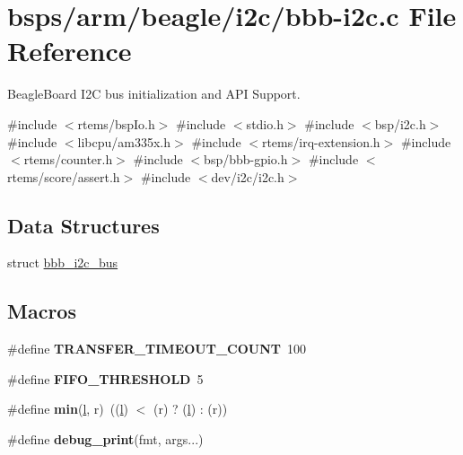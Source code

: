 \hypertarget{bbb-i2c_8c}{}\section{bsps/arm/beagle/i2c/bbb-\/i2c.c File Reference}
\label{bbb-i2c_8c}


Beagle\+Board I2C bus initialization and A\+PI Support.  


{\ttfamily \#include $<$rtems/bsp\+Io.\+h$>$}\newline
{\ttfamily \#include $<$stdio.\+h$>$}\newline
{\ttfamily \#include $<$bsp/i2c.\+h$>$}\newline
{\ttfamily \#include $<$libcpu/am335x.\+h$>$}\newline
{\ttfamily \#include $<$rtems/irq-\/extension.\+h$>$}\newline
{\ttfamily \#include $<$rtems/counter.\+h$>$}\newline
{\ttfamily \#include $<$bsp/bbb-\/gpio.\+h$>$}\newline
{\ttfamily \#include $<$rtems/score/assert.\+h$>$}\newline
{\ttfamily \#include $<$dev/i2c/i2c.\+h$>$}\newline
\subsection*{Data Structures}
\begin{DoxyCompactItemize}
\item 
struct \mbox{\hyperlink{structbbb__i2c__bus}{bbb\+\_\+i2c\+\_\+bus}}
\end{DoxyCompactItemize}
\subsection*{Macros}
\begin{DoxyCompactItemize}
\item 
\mbox{\label{bbb-i2c_8c_aaa02cd8bfe5cbd03a2bd1d65aa999534}} 
\#define {\bfseries T\+R\+A\+N\+S\+F\+E\+R\+\_\+\+T\+I\+M\+E\+O\+U\+T\+\_\+\+C\+O\+U\+NT}~100
\item 
\mbox{\label{bbb-i2c_8c_a7d44477546ebc96920125d612e718b10}} 
\#define {\bfseries F\+I\+F\+O\+\_\+\+T\+H\+R\+E\+S\+H\+O\+LD}~5
\item 
\mbox{\label{bbb-i2c_8c_a8a23efc88a0a2646598e949f40d96d0d}} 
\#define {\bfseries min}(\mbox{\hyperlink{sun4u_2tte_8h_ab80d2bb0a8a32941fb282b41785ce07f}{l}},  r)~((\mbox{\hyperlink{sun4u_2tte_8h_ab80d2bb0a8a32941fb282b41785ce07f}{l}}) $<$ (r) ? (\mbox{\hyperlink{sun4u_2tte_8h_ab80d2bb0a8a32941fb282b41785ce07f}{l}}) \+: (r))
\item 
\mbox{\label{bbb-i2c_8c_a330a370597fdf05e3d01b51f15b733b3}} 
\#define {\bfseries debug\+\_\+print}(fmt,  args...)
\end{DoxyCompactItemize}

